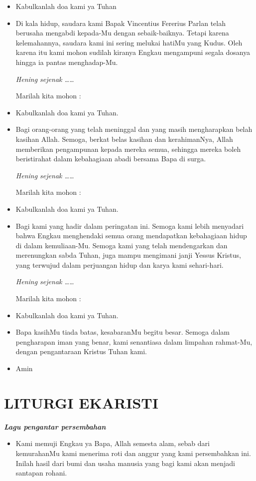 \documentclass[titlepage,10pt,openany]{scrbook}
\makeatletter
\newcommand{\lagu}[1]{%
  {\parindent \z@ 
    \interlinepenalty\@M \slshape \bfseries \normalsize \textit{#1}\par\nobreak \vskip 10\p@ }}
\newcommand{\BU}[1]{\begin{itemize} \item[U:] #1 \end{itemize}}
\newcommand{\BI}[1]{\begin{itemize} \item[I:] #1 \end{itemize}}
\newcommand{\BP}[1]{\begin{itemize} \item[P:] #1 \end{itemize}}
\newcommand{\namaalm}{Bapak Vincentius Fererius Parlan }
\makeatother
\begin{document}
\BU{Kabulkanlah doa kami ya Tuhan}


\BP{Di kala hidup, saudara kami \namaalm{} telah berusaha mengabdi kepada-Mu dengan sebaik-baiknya. 
Tetapi karena kelemahannya, saudara kami ini sering melukai hatiMu yang Kudus. Oleh karena itu kami mohon 
sudilah kiranya Engkau mengampuni segala dosanya hingga ia pantas menghadap-Mu. 

\textit{Hening sejenak \ldots\ldots} 

Marilah kita mohon :}

\BU{Kabulkanlah doa kami ya Tuhan.}

\BP{Bagi orang-orang yang telah meninggal dan
yang masih mengharapkan belah kasihan Allah.
Semoga, berkat belas kasihan dan kerahimanNya,
Allah  memberikan pengampunan kepada
mereka semua, sehingga mereka boleh beristirahat dalam kebahagiaan abadi bersama Bapa
di surga. 

\textit{Hening sejenak \ldots\ldots} 

Marilah kita mohon :}

\BU{Kabulkanlah doa kami ya Tuhan.}

\BP{Bagi kami yang hadir dalam peringatan ini.
Semoga kami lebih menyadari bahwa Engkau menghendaki semua orang mendapatkan kebahagiaan
hidup di dalam kemuliaan-Mu.
Semoga kami yang telah mendengarkan dan merenungkan sabda Tuhan, juga mampu mengimani
janji Yessus Kristus, yang terwujud dalam perjuangan hidup dan karya kami sehari-hari.

\textit{Hening sejenak \ldots\ldots} 

Marilah kita mohon :}

\BU{Kabulkanlah doa kami ya Tuhan.}


\BI{Bapa kasihMu tiada batas, kesabaranMu begitu besar. Semoga dalam pengharapan iman yang benar, kami senantiasa dalam limpahan rahmat-Mu, dengan pengantaraan Kristus Tuhan kami.}

\BU{Amin}

\section*{LITURGI EKARISTI}

\lagu{Lagu pengantar persembahan}


\BI{Kami memuji Engkau ya Bapa, Allah semesta alam, sebab 
dari kemurahanMu kami menerima roti dan anggur yang 
kami persembahkan ini. Inilah hasil dari bumi dan usaha 
manusia yang bagi kami akan menjadi santapan rohani.}
\end{document}
